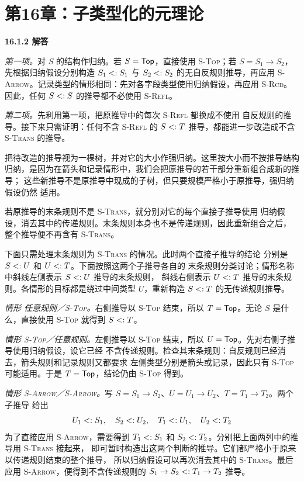 \newpage
\section{第16章：子类型化的元理论}

\begin{taplauthorsolutionentrybox}
\label{sol:author:16.1.2}
\textbf{16.1.2 解答}

\emph{第一项。}对 \(S\) 的结构作归纳。若 \(S=\mathsf{Top}\)，直接使用
\textsc{S-Top}；若 \(S=S_1\to S_2\)，先根据归纳假设分别构造
\(S_1\mathrel{<:} S_1\) 与 \(S_2\mathrel{<:} S_2\) 的无自反规则推导，再应用
\textsc{S-Arrow}。记录类型的情形相同：先对各字段类型使用归纳假设，再应用
\textsc{S-Rcd}。因此，任何 \(S\mathrel{<:} S\) 的推导都不必使用
\textsc{S-Refl}。

\emph{第二项。}先利用第一项，把原推导中的每次 \textsc{S-Refl} 都换成不使用
自反规则的推导。接下来只需证明：任何不含 \textsc{S-Refl} 的
\(S\mathrel{<:} T\) 推导，都能进一步改造成不含 \textsc{S-Trans} 的推导。

把待改造的推导视为一棵树，并对它的大小作强归纳。这里按大小而不按推导结构
归纳，是因为在箭头和记录情形中，我们会把原推导的若干部分重新组合成新的推导；
这些新推导不是原推导中现成的子树，但只要规模严格小于原推导，强归纳假设仍然
适用。

若原推导的末条规则不是 \textsc{S-Trans}，就分别对它的每个直接子推导使用
归纳假设，消去其中的传递规则。末条规则本身也不是传递规则，因此重新组合之后，
整个推导便不再含有 \textsc{S-Trans}。

下面只需处理末条规则为 \textsc{S-Trans} 的情况。此时两个直接子推导的结论
分别是 \(S\mathrel{<:} U\) 和 \(U\mathrel{<:} T\)。下面按照这两个子推导各自的
末条规则分类讨论；情形名称中斜线左侧表示 \(S\mathrel{<:} U\) 推导的末条规则，
斜线右侧表示 \(U\mathrel{<:} T\) 推导的末条规则。各情形的目标都是绕过中间类型
\(U\)，重新构造 \(S\mathrel{<:} T\) 的无传递规则推导。

\emph{情形 任意规则／\textsc{S-Top}。}右侧推导以 \textsc{S-Top}
结束，所以 \(T=\mathsf{Top}\)。无论 \(S\) 是什么，直接使用
\textsc{S-Top} 就得到 \(S\mathrel{<:} T\)。

\emph{情形 \textsc{S-Top}／任意规则。}左侧推导以 \textsc{S-Top}
结束，所以 \(U=\mathsf{Top}\)。先对右侧子推导使用归纳假设，设它已经
不含传递规则。检查其末条规则：自反规则已经消去，箭头规则和记录规则又都要求
左侧类型分别是箭头或记录，因此只有 \textsc{S-Top} 可能适用。于是
\(T=\mathsf{Top}\)，结论仍由 \textsc{S-Top} 得到。

\emph{情形 \textsc{S-Arrow}／\textsc{S-Arrow}。}写
\(S=S_1\to S_2\)、\(U=U_1\to U_2\)、\(T=T_1\to T_2\)。两个子推导
给出
\[
 U_1\mathrel{<:} S_1,\quad S_2\mathrel{<:} U_2,\quad
 T_1\mathrel{<:} U_1,\quad U_2\mathrel{<:} T_2
\]
为了直接应用 \textsc{S-Arrow}，需要得到 \(T_1\mathrel{<:} S_1\) 和
\(S_2\mathrel{<:} T_2\)。分别把上面两列中的推导用 \textsc{S-Trans} 接起来，
即可暂时构造出这两个判断的推导。它们都严格小于原来以传递规则结束的整个推导，
所以归纳假设可以再次消去其中的 \textsc{S-Trans}。最后应用
\textsc{S-Arrow}，便得到不含传递规则的
\(S_1\to S_2\mathrel{<:} T_1\to T_2\) 推导。


\end{taplauthorsolutionentrybox}
